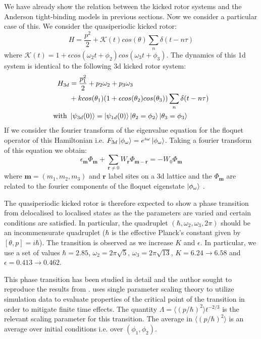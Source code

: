 \documentclass[twocolumn]{report}
\begin{document}
We have already show the relation between the kicked rotor systems and the
Anderson tight-binding models in previous sections. Now we consider a
particular case of this. We consider the quasiperiodic kicked rotor:
%
\begin{equation}
    H = \frac{p^2}{2} + \mathcal{K}(t) cos(\theta) \sum_n \delta(t - n\tau)
\end{equation}
%
where $\mathcal{K}(t) = 1 + \epsilon cos(\omega_2 t + \phi_2)
cos(\omega_3 t + \phi_3)$. The dynamics of this 1d system is identical
to the following 3d kicked rotor system:
%
\begin{align}
    H_{3d} &= \frac{p_1^2}{2} + p_2 \omega_2 + p_3 \omega_3\\
    &+ k cos(\theta_1) (1 + \epsilon cos(\theta_2) cos(\theta_3))
    \sum_n \delta(t - n\tau)\\
    \text{with } &\ket{\psi_{3d}(0)} = \ket{\psi_{1d}(0)}
    \ket{\theta_2 = \phi_2}\ket{\theta_3 = \phi_3}
\end{align}
%
If we consider the fourier transform of the eigenvalue equation
for the floquet operator of this Hamiltonian i.e.
$F_{3d}\ket{\phi_\omega} = e^{i\omega}\ket{\phi_\omega}$.
Taking a fourier transform of this equation we obtain:
%
\begin{equation}
    \epsilon_{\mathbf{m}} \Phi_{\mathbf{m}} + \sum_{\mathbf{r} \neq 0}
    W_{\mathbf{r}}\Phi_{\mathbf{m - r}} = -W_0 \Phi_{\mathbf{m}}
\end{equation}
%
where $\mathbf{m} = (m_1, m_2, m_3)$ and $\mathbf{r}$ label sites on
a 3d lattice and the $\Phi_{\mathbf{m}}$ are related to the fourier
components of the floquet eigenstate $\ket{\phi_\omega}$
\cite{fishman_chaos_1982}\cite{lemarie_universality_2009}.

The quasiperiodic kicked rotor is therefore expected to show a
phase transition from delocalised to localised states as the
the parameters are varied and certain conditions are satisfied.
In particular, the quadruplet $(\hbar, \omega_2, \omega_3, 2\pi)$
should be an incommensurate quadruplet ($\hbar$ is the effective
Planck's constant given by $[\theta, p] = i\hbar$). The transition
is observed as we increase $K$ and $\epsilon$. In particular, we use
a set of values $\hbar =  2.85$, $\omega_2 = 2\pi\sqrt{5}$,
$\omega_3 = 2\pi\sqrt{13}$, $K = 6.24 \to 6.58$ and
$\epsilon = 0.413 \to 0.462$. \cite{lemarie_universality_2009}

This phase transition has been studied in detail and the author
sought to reproduce the results from \cite{lemarie_universality_2009}.
\cite{lemarie_universality_2009} uses single parameter scaling theory
to utilize simulation data to evaluate properties of the critical
point of the transition in order to mitigate finite time effects.
The quantity $\Lambda = \langle (p/\hbar)^2 \rangle t^{-2/3}$ is
the relevant scaling parameter for this transition. The average in
$\langle (p/\hbar)^2 \rangle$ is an average over initial conditions
i.e. over $(\phi_1, \phi_2)$.
\end{document}
